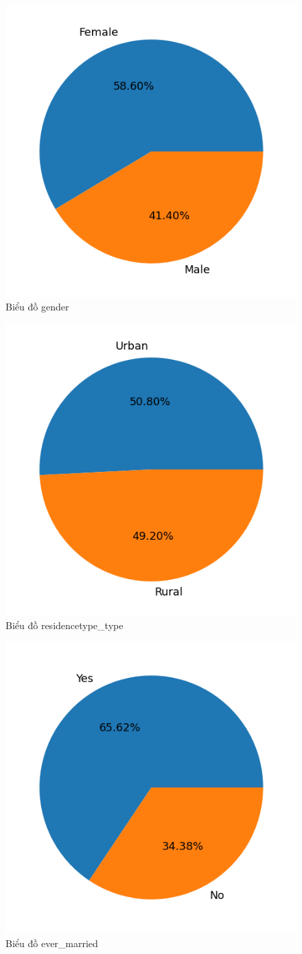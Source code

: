 \documentclass[11pt]{article}
\begin{document}
	 \begin{figure}[H]
	 	\centering
	 	\includegraphics[width=0.5\linewidth]{genderPie}
	 	\caption{Biểu đồ gender}
	 	\label{fig:genderpie}
	 \end{figure}
	 
	 \begin{figure}[H]
	 	\centering
	 	\includegraphics[width=0.5\linewidth]{residencePie}
	 	\caption{Biểu đồ residencetype\_type}
	 	\label{fig:residencepie}
	 \end{figure}
	 
	 \begin{figure}[H]
	 	\centering
	 	\includegraphics[width=0.5\linewidth]{marriedPie}
	 	\caption{Biểu đồ ever\_married}
	 	\label{fig:marriedpie}
	 \end{figure}
	 
\end{document}
